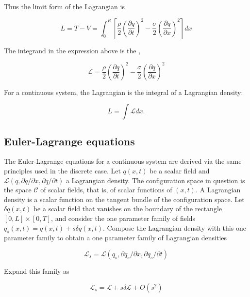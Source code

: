Thus the limit form of the Lagrangian is

\begin{equation}
L = T - V
=
 \int_0^R \left[ \frac{\rho}{2}\left(\frac{\partial q}{\partial t} \right)^2
 -
\frac{\sigma}{2} \left(\frac{\partial q}{\partial x} \right)^2 \right]dx
\end{equation}

The integrand in the expression above is the ,

\begin{equation}
\mathcal{L} = \frac{\rho}{2}\left(\frac{\partial q}{\partial t} \right)^2
 -
\frac{\sigma}{2} \left(\frac{\partial q}{\partial x} \right)^2
\end{equation}

For a continuous system, the Lagrangian is the integral of a Lagrangian density:

\begin{equation}
L = \int \mathcal{L} dx .
\end{equation}


\subsection{Euler-Lagrange equations}

The Euler-Lagrange equations for a continuous system are derived via the same principles used in the discrete case.  Let $q(x, t)$ be a scalar field and $\mathcal{L}(q, \partial q/\partial x, \partial q/\partial t)$ a Lagrangian density. The configuration space in question is the space $\mathcal{C}$ of scalar fields, that is, of scalar functions of $(x,t)$.  A Lagrangian density is a scalar function on the tangent bundle of the configuration space.  Let $\delta q(x,t)$ be a scalar field that vanishes on the boundary of the rectangle $[0,L]\times[0,T]$, and consider
the one parameter family of fields $q_s(x,t) = q(x,t) + s\delta q(x,t)$. Compose the Lagrangian density with this one parameter family to obtain a one parameter family of Lagrangian densities

\begin{equation}
\mathcal{L}_s = \mathcal{L}(q_s, \partial q_s/\partial x,  \partial q_s/\partial t)
\end{equation}

Expand this family as

\begin{equation}
\mathcal{L}_s = \mathcal{L} + s\delta \mathcal{L} + O(s^2)
\end{equation}

